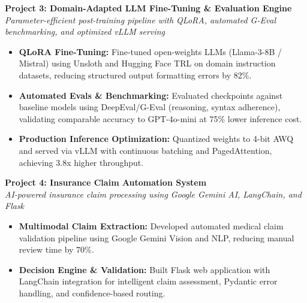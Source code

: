\documentclass[a4paper,10pt]{article}
\begin{document}
\vspace{6pt}

\noindent
\textbf{\color{projecttitle}Project 3: Domain-Adapted LLM Fine-Tuning \& Evaluation Engine} \\
\textit{\small Parameter-efficient post-training pipeline with QLoRA, automated G-Eval benchmarking, and optimized vLLM serving}
\begin{itemize}
    \item \textbf{QLoRA Fine-Tuning:} Fine-tuned open-weights LLMs (Llama-3-8B / Mistral) using Unsloth and Hugging Face TRL on domain instruction datasets, reducing structured output formatting errors by 82\%.
    \item \textbf{Automated Evals \& Benchmarking:} Evaluated checkpoints against baseline models using DeepEval/G-Eval (reasoning, syntax adherence), validating comparable accuracy to GPT-4o-mini at 75\% lower inference cost.
    \item \textbf{Production Inference Optimization:} Quantized weights to 4-bit AWQ and served via vLLM with continuous batching and PagedAttention, achieving 3.8x higher throughput.
\end{itemize}

\vspace{6pt}

\noindent
\textbf{\color{projecttitle}Project 4: Insurance Claim Automation System} \\
\textit{\small AI-powered insurance claim processing using Google Gemini AI, LangChain, and Flask}
\begin{itemize}
    \item \textbf{Multimodal Claim Extraction:} Developed automated medical claim validation pipeline using Google Gemini Vision and NLP, reducing manual review time by 70\%.
    \item \textbf{Decision Engine \& Validation:} Built Flask web application with LangChain integration for intelligent claim assessment, Pydantic error handling, and confidence-based routing.
\end{itemize}

\end{document}
